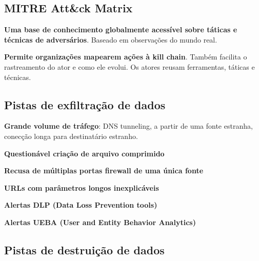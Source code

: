\documentclass{article}
\begin{document}
\subsection{MITRE Att\&ck Matrix}

\begin{flushleft}
  \textbf{Uma base de conhecimento globalmente acessível sobre táticas e técnicas
  de adversários}. Baseado em observações do mundo real.

  \vspace{2mm}

  \textbf{Permite organizações mapearem ações à kill chain}. Também facilita o
  rastreamento do ator e como ele evolui. Os atores reusam ferramentas,
  táticas e técnicas.
\end{flushleft}

\pagebreak

\subsection{Pistas de exfiltração de dados}

\begin{flushleft}
  \textbf{Grande volume de tráfego}: DNS tunneling, a partir de uma fonte estranha,
  conecção longa para destinatário estranho.

  \vspace{2mm}

  \textbf{Questionável criação de arquivo comprimido}

  \vspace{2mm}
  
  \textbf{Recusa de múltiplas portas firewall de uma única fonte}

  \vspace{2mm}

  \textbf{URLs com parâmetros longos inexplicáveis}

  \vspace{2mm}

  \textbf{Alertas DLP (Data Loss Prevention tools)}

  \vspace{2mm}

  \textbf{Alertas UEBA (User and Entity Behavior Analytics)}
\end{flushleft}

\subsection{Pistas de destruição de dados}
\end{document}
